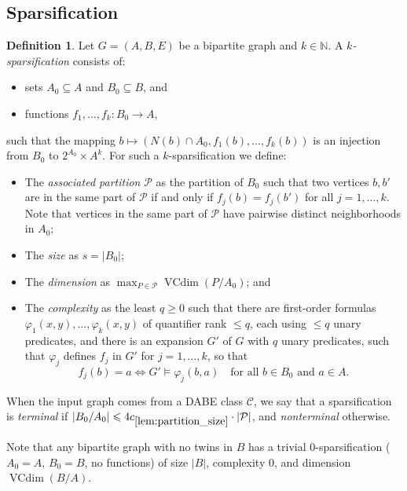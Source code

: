\documentclass[11pt]{article}
\theoremstyle{definition}
\newtheorem{definition}{Definition}
\newcommand{\CC}{{\mathscr C}}
\newcommand{\N}{\mathbb{N}}
\newcommand{\inducedSS}[2]{#1/#2}%
\renewcommand{\le}{\leqslant}
\renewcommand{\ge}{\geqslant}
\newcommand{\from}{\colon}
\renewcommand{\cal}{\mathcal}
\DeclareMathOperator{\VCdim}{VCdim}
\let\phi\varphi
\newcommand{\Pp}{\mathcal{P}}
\newcommand{\remph}[1]{{\color{red} \emph{#1}}}
\begin{document}
\subsection{Sparsification}

\begin{definition}
  Let $G=(A,B,E)$ be a bipartite graph and $k\in\N$.
  A \remph{$k$-sparsification} consists of:
  \begin{itemize}
    \item sets $A_0\subseteq A$ and $B_0\subseteq B$, and
    \item functions $f_1,\ldots,f_k\from B_0\to A$,
  \end{itemize}
  such that
  the mapping $b\mapsto (N(b)\cap A_0,f_1(b),\ldots,f_k(b))$ is an injection from $B_0$ to $2^{A_0} \times A^k$.
For such a $k$-sparsification we define:
\begin{itemize}
  \item The \emph{associated partition} $\cal P$ as the partition of $B_0$ such that two vertices $b,b'$ are in the same part of $\cal P$ if and only if 
  $f_j(b)=f_j(b')$ for all $j=1,\ldots,k$. Note that vertices in the same part of $\cal P$ have pairwise distinct neighborhoods in $A_0$;
  \item The \emph{size} as $s=|B_0|$;
  \item The \emph{dimension} as $\max_{P\in\cal P} \VCdim(\inducedSS{P}{A_0})$; and
  \item The \emph{complexity} as the least $q\ge0$ such that there are first-order formulas $\phi_1(x,y),\ldots,\phi_k(x,y)$ of quantifier rank ${\le}q$, each using ${\le}q$ unary predicates, and there is an expansion $G'$ of $G$ with $q$ unary predicates,
  such that $\phi_j$ defines $f_j$ in $G'$ for $j=1,\ldots,k$, so that 
  \[
    f_j(b)=a\iff G'\models \phi_j(b,a)
    \quad
    \text{for all $b\in B_0$ and $a\in A$.}  
  \]
\end{itemize}
When the input graph comes from a DABE class $\CC$, we say that a sparsification is \remph{terminal} if $|B_0/A_0| \le 4 c_{\ref{lem:partition_size}} \cdot|\Pp|$, and
\remph{nonterminal} otherwise.
\end{definition}


Note that any bipartite graph with no twins in $B$ has a trivial $0$-sparsification ($A_0=A$, $B_0=B$, no functions) of size $|B|$, complexity $0$, and dimension $\VCdim(\inducedSS{B}{A})$.
\end{document}
